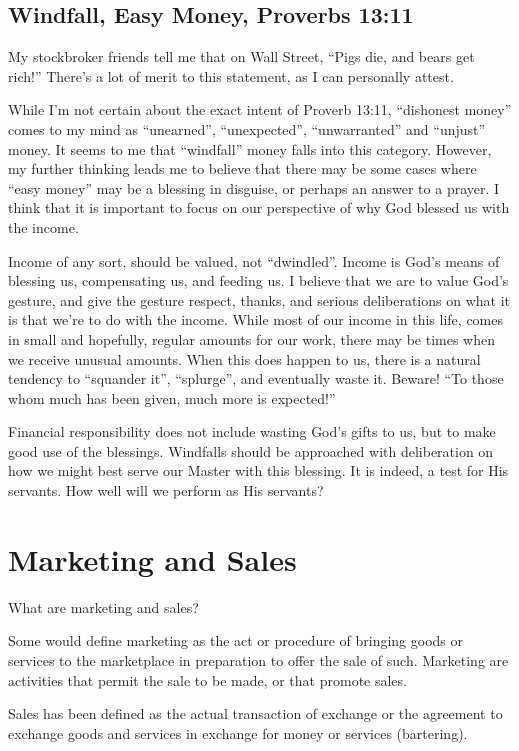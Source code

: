 \documentclass[12pt]{memoir}
\begin{document}
\section{Windfall, Easy Money, Proverbs 13:11}

My stockbroker friends tell me that on Wall Street, ``Pigs die, and
bears get rich!'' There's a lot of merit to this statement, as I
can personally attest.

While I'm not certain about the exact intent of Proverb 13:11, ``dishonest
money'' comes to my mind as ``unearned'', ``unexpected'', ``unwarranted''
and ``unjust'' money. It seems to me that ``windfall'' money falls
into this category. However, my further thinking leads me to believe
that there may be some cases where ``easy money'' may be a blessing
in disguise, or perhaps an answer to a prayer. I think that it is
important to focus on our perspective of why God blessed us with the
income. 

Income of any sort, should be valued, not ``dwindled''. Income is
God's means of blessing us, compensating us, and feeding us. I believe
that we are to value God's gesture, and give the gesture respect,
thanks, and serious deliberations on what it is that we're to do with
the income. While most of our income in this life, comes in small
and hopefully, regular amounts for our work, there may be times when
we receive unusual amounts. When this does happen to us, there is
a natural tendency to ``squander it'', ``splurge'', and eventually
waste it. Beware! ``To those whom much has been given, much more
is expected!'' 

Financial responsibility does not include wasting God's gifts to us,
but to make good use of the blessings. Windfalls should be approached
with deliberation on how we might best serve our Master with this
blessing. It is indeed, a test for His servants. How well will we
perform as His servants?

\chapter{Marketing and Sales}

What are marketing and sales?

Some would define marketing as the act or procedure of bringing goods
or services to the marketplace in preparation to offer the sale of
such. Marketing are activities that permit the sale to be made, or
that promote sales.

Sales has been defined as the actual transaction of exchange or the
agreement to exchange goods and services in exchange for money or
services (bartering).
\end{document}
